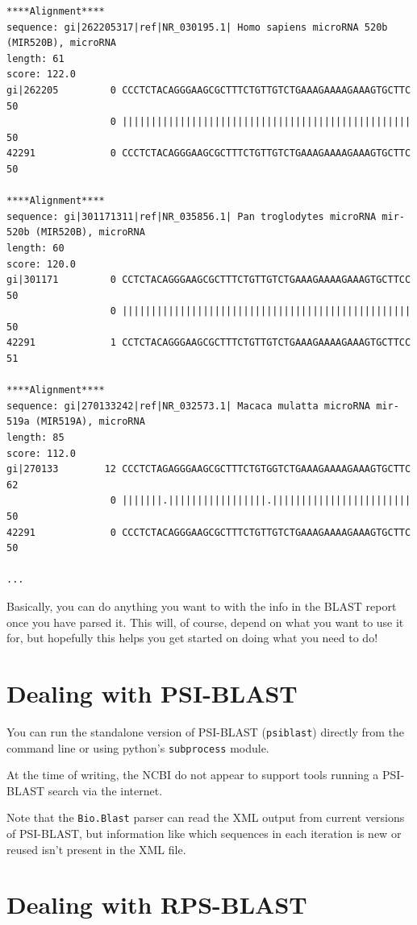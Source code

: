 \begin{verbatim}
****Alignment****
sequence: gi|262205317|ref|NR_030195.1| Homo sapiens microRNA 520b (MIR520B), microRNA
length: 61
score: 122.0
gi|262205         0 CCCTCTACAGGGAAGCGCTTTCTGTTGTCTGAAAGAAAAGAAAGTGCTTC 50
                  0 |||||||||||||||||||||||||||||||||||||||||||||||||| 50
42291             0 CCCTCTACAGGGAAGCGCTTTCTGTTGTCTGAAAGAAAAGAAAGTGCTTC 50

****Alignment****
sequence: gi|301171311|ref|NR_035856.1| Pan troglodytes microRNA mir-520b (MIR520B), microRNA
length: 60
score: 120.0
gi|301171         0 CCTCTACAGGGAAGCGCTTTCTGTTGTCTGAAAGAAAAGAAAGTGCTTCC 50
                  0 |||||||||||||||||||||||||||||||||||||||||||||||||| 50
42291             1 CCTCTACAGGGAAGCGCTTTCTGTTGTCTGAAAGAAAAGAAAGTGCTTCC 51

****Alignment****
sequence: gi|270133242|ref|NR_032573.1| Macaca mulatta microRNA mir-519a (MIR519A), microRNA
length: 85
score: 112.0
gi|270133        12 CCCTCTAGAGGGAAGCGCTTTCTGTGGTCTGAAAGAAAAGAAAGTGCTTC 62
                  0 |||||||.|||||||||||||||||.|||||||||||||||||||||||| 50
42291             0 CCCTCTACAGGGAAGCGCTTTCTGTTGTCTGAAAGAAAAGAAAGTGCTTC 50

...
\end{verbatim}

Basically, you can do anything you want to with the info in the BLAST
report once you have parsed it. This will, of course, depend on what
you want to use it for, but hopefully this helps you get started on
doing what you need to do!

\section{Dealing with PSI-BLAST}

You can run the standalone version of PSI-BLAST (\verb|psiblast|) directly
from the command line or using python's \verb|subprocess| module.

At the time of writing, the NCBI do not appear to support tools running a
PSI-BLAST search via the internet.

Note that the \verb|Bio.Blast| parser can read the XML output from
current versions of PSI-BLAST, but information like which sequences in each
iteration is new or reused isn't present in the XML file.

\section{Dealing with RPS-BLAST}

